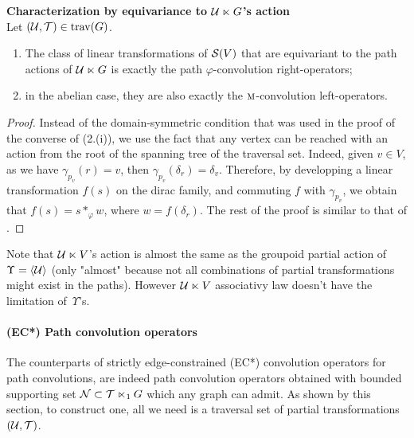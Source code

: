 \begin{proposition}\textbf{Characterization by equivariance to $\mathcal{U} \ltimes G$'s action}\\
Let $(\mathcal{U}, \mathcal{T}) \in \operatorname{trav}(G)$.
\begin{enumerate}[label=(\roman*)]
\item The class of linear transformations of $\mathcal{S}(V)$ that are equivariant to the path actions of $\mathcal{U} \ltimes G$ is exactly the path $\varphi$-convolution right-operators;
\item in the abelian case, they are also exactly the $\operatorname{\textsc{m}}$-convolution left-operators.
\end{enumerate}
\end{proposition}

\begin{proof}
Instead of the domain-symmetric condition that was used in the proof of the converse of  (2.(i)), we use the fact that any vertex can be reached with an action from the root of the spanning tree of the traversal set. Indeed, given $v \in V$, as we have $\gamma_{p_v}(r)=v$, then $\gamma_{p_v}(\delta_r) = \delta_v$. Therefore, by developping a linear transformation $f(s)$ on the dirac family, and commuting $f$ with $\gamma_{p_v}$, we obtain that $f(s) = s \ast_\varphi w$, where $w = f(\delta_r)$. The rest of the proof is similar to that of .
\end{proof}

\begin{remark}
Note that $\mathcal{U} \ltimes V$'s action is almost the same as the groupoid partial action of $\Upsilon = \langle \mathcal{U} \rangle$ (only "almost" because not all combinations of partial transformations might exist in the paths). However $\mathcal{U} \ltimes V$ associativy law doesn't have the limitation of~$\Upsilon$'s.
\end{remark}

\paragraph{(EC*) Path convolution operators}
The counterparts of strictly edge-constrained (EC*) convolution operators for path convolutions, are indeed path convolution operators obtained with bounded supporting set $\mathcal{N} \subset \mathcal{T} \ltimes_1 G$ which any graph can admit. As shown by this section, to construct one, all we need is a traversal set of partial transformations $(\mathcal{U}, \mathcal{T})$.

